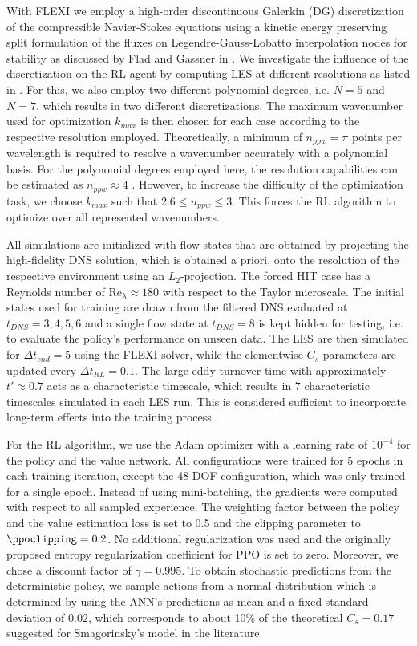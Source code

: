 With FLEXI we employ a high-order discontinuous Galerkin (DG) discretization of the compressible Navier-Stokes equations using a kinetic energy preserving split formulation of the fluxes on Legendre-Gauss-Lobatto interpolation nodes for stability as discussed by Flad and Gassner in \cite{flad2017use}.
We investigate the influence of the discretization on the RL agent by computing LES at different resolutions as listed in .
For this, we also employ two different polynomial degrees, i.e. $N=5$ and $N=7$, which results in two different discretizations. 
The maximum wavenumber used for optimization $k_{max}$ is then chosen for each case according to the respective resolution employed.
Theoretically, a minimum of $n_{ppw}=\pi$ points per wavelength is required to resolve a wavenumber accurately with a polynomial basis.
For the polynomial degrees employed here, the resolution capabilities can be estimated as $n_{ppw}\approx 4$ \cite{gassner2011comparison}.
However, to increase the difficulty of the optimization task, we choose $k_{max}$ such that $2.6 \le n_{ppw} \le 3$.
This forces the RL algorithm to optimize over all represented wavenumbers.
 
All simulations are initialized with flow states that are obtained by projecting the high-fidelity DNS solution, which is obtained a priori, onto the resolution of the respective environment using an $L_2$-projection.
The forced HIT case has a Reynolds number of $\mathrm{Re}_{\lambda}\approx 180$ with respect to the Taylor microscale.
The initial states used for training are drawn from the filtered DNS evaluated at $t_{DNS}=3,4,5,6$ and a single flow state at $t_{DNS}=8$ is kept hidden for testing, i.e. to evaluate the policy's performance on unseen data.
The LES are then simulated for $\Delta t_{end}=5$ using the FLEXI solver, while the elementwise $C_s$ parameters are updated every $\Delta t_{RL}=0.1$.
The large-eddy turnover time with approximately $t'\approx 0.7$ acts as a characteristic timescale, which results in 7 characteristic timescales simulated in each LES run.
This is considered sufficient to incorporate long-term effects into the training process.

For the RL algorithm, we use the Adam optimizer \cite{kingma2014adam} with a learning rate of $10^{-4}$ for the policy and the value network.
All configurations were trained for 5 epochs in each training iteration, except the 48 DOF configuration, which was only trained for a single epoch.
Instead of using mini-batching, the gradients were computed with respect to all sampled experience.
The weighting factor between the policy and the value estimation loss is set to 0.5 and the clipping parameter to $\ppoclipping=0.2$.
No additional regularization was used and the originally proposed entropy regularization coefficient for PPO is set to zero.
Moreover, we chose a discount factor of $\gamma=0.995$.
To obtain stochastic predictions from the deterministic policy, we sample actions from a normal distribution which is determined by using the ANN's predictions as mean and a fixed standard deviation of 0.02, which corresponds to about 10\% of the theoretical $C_s=0.17$ suggested for Smagorinsky's model in the literature.
